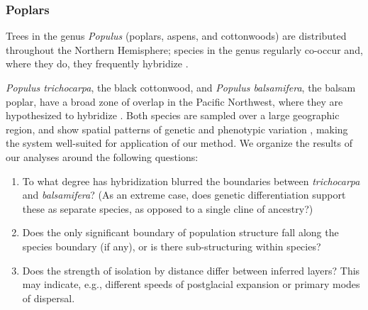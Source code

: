 \documentclass[12pt]{article}
\begin{document}
\subsubsection*{Poplars}

Trees in the genus \textit{Populus} (poplars, aspens, and cottonwoods) 
are distributed throughout the Northern Hemisphere;
species in the genus regularly co-occur and, 
where they do, they frequently hybridize \citep{eckenwalder1984, Cronk2005}.

\textit{Populus trichocarpa}, the black cottonwood,
and \textit{Populus balsamifera}, the balsam poplar,
have a broad zone of overlap in the Pacific Northwest,
where they are hypothesized to hybridize \citep{geraldes_etal_2014, suarezgonzalez_etal_2016}.
Both species are sampled over a large geographic region, 
and show spatial patterns of genetic and phenotypic variation \citep{slavov_etal_2012, mckown_etal_2013},
making the system well-suited for application of our method.
We organize the results of our analyses around the following questions: 
\begin{enumerate}

    \item To what degree has hybridization blurred the boundaries between 
        \textit{trichocarpa} and \textit{balsamifera}?
        (As an extreme case, does genetic differentiation support these as separate species,
        as opposed to a single cline of ancestry?)

    \item Does the only significant boundary of population structure
        fall along the species boundary (if any),
        or is there sub-structuring within species?

    \item Does the strength of isolation by distance differ between inferred layers?
        This may indicate, e.g., different speeds of postglacial expansion
        or primary modes of dispersal.

\end{enumerate}
\end{document}
